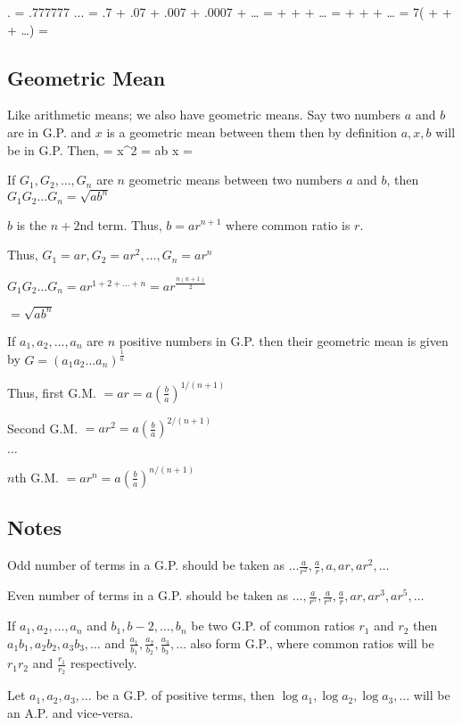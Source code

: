 \startformula . = .777777 ... \infty\stopformula
\startformula = .7 + .07 + .007 + .0007 + \ldots\stopformula
\startformula =  +  +  + \ldots\stopformula
\startformula =  +  +  + \ldots\stopformula
\startformula = 7\left( +  +  + \ldots\right)\stopformula
\startformula = \stopformula

\subsection{Geometric Mean}
Like arithmetic means; we also have geometric means. Say two numbers $a$ and $b$ are in G.P. and $x$ is a geometric mean between
them then by definition $a, x, b$ will be in G.P. Then,
\startformula {} = \stopformula
\startformula \Rightarrow x^2 = ab \Rightarrow x = \stopformula

If $G_1, G_2, \ldots, G_n$ are $n$ geometric means between two numbers $a$ and $b$, then $G_1G_2\ldots G_n = \sqrt{ab^n}$

 $b$ is the $n + 2$nd term. Thus, $b = ar^{n + 1}$ where common ratio is $r$.

Thus, $G_1 = ar, G_2 = ar^2, \ldots, G_n = ar^n$

$G_1G_2\ldots G_n = ar^{1 + 2 + \ldots + n} = ar^{\frac{n(n + 1)}{2}}$

$= \sqrt{ab^n}$

If $a_1, a_2, \ldots, a_n$ are $n$ positive numbers in G.P. then their geometric mean is given by $G = (a_1a_2\ldots
a_n)^{\frac{1}{n}}$

Thus, first G.M. $= ar = a\left(\frac{b}{a}\right)^{1/(n + 1)}$

Second G.M. $= ar^2 = a\left(\frac{b}{a}\right)^{2/(n + 1)}$

$\ldots$

$n$th G.M. $= ar^{n} = a\left(\frac{b}{a}\right)^{n/(n + 1)}$
\subsection{Notes}
\startitemize[n]
\item Odd number of terms in a G.P. should be taken as $\ldots\frac{a}{r^2}, \frac{a}{r}, a, ar, ar^2, \ldots$
\item Even number of terms in a G.P. should be taken as $\ldots, \frac{a}{r^5}, \frac{a}{r^3}, \frac{a}{r}, ar, ar^3, ar^5, \ldots$
\item If $a_1, a_2, \ldots, a_n$ and $b_1, b-2, \ldots, b_n$ be two G.P. of common ratios $r_1$ and $r_2$ then $a_1b_1, a_2b_2,
  a_3b_3, \ldots$ and $\frac{a_1}{b_1}, \frac{a_2}{b_2}, \frac{a_3}{b_3}, \ldots$ also form G.P., where common ratios will be
  $r_1r_2$ and $\frac{r_1}{r_2}$ respectively.
\item Let $a_1, a_2, a_3, \ldots$ be a G.P. of positive terms, then $\log a_1, \log a_2, \log a_3, \ldots$ will be an A.P. and
  vice-versa.

